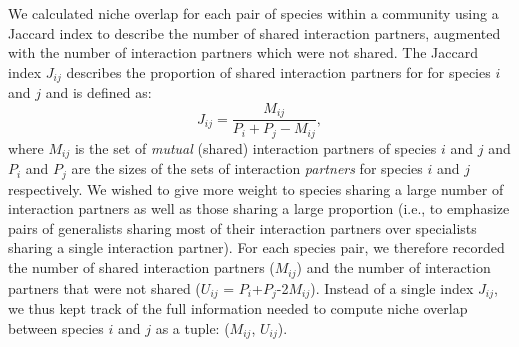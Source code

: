 \documentclass[12pt]{article}
\begin{document}
\begin{spacing}{1.5}
    We calculated niche overlap for each pair of species within a community 
    using a Jaccard index to describe the number of shared interaction 
    partners, augmented with the number of interaction partners which were 
    not shared. The Jaccard index $J_{ij}$ describes the proportion of 
    shared interaction partners for for species $i$ and $j$ and is defined as: 
    \begin{equation}
      J_{ij} = \frac{M_{ij}}{P_i+P_j-M_{ij}} ,
    \end{equation}
    where $M_{ij}$ is the set of \emph{mutual} (shared) interaction partners of 
    species $i$ and $j$ and $P_i$ and $P_j$ are the sizes of the sets of interaction 
    \emph{partners} for species $i$ and $j$ respectively. We wished to give more 
    weight to species sharing a large number of interaction partners as well as 
    those sharing a large proportion (i.e., to emphasize pairs of generalists 
    sharing most of their interaction partners over specialists sharing a single 
    interaction partner). For each species pair, we therefore recorded the number of 
    shared interaction partners ($M_{ij}$) and the number of interaction partners 
    that were not shared 
    ($U_{ij}$ = $P_{i}$+$P_{j}$-2$M_{ij}$). Instead of a single index $J_{ij}$, 
    we thus kept track of the full information needed to compute
    niche overlap between species $i$ and $j$ as a tuple: ($M_{ij}$, $U_{ij}$).





\end{spacing}
\end{document}
